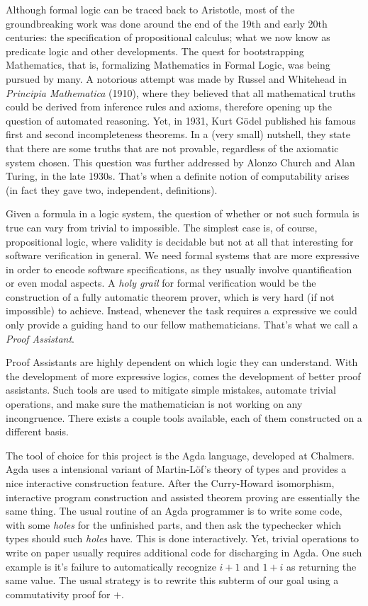 Although formal logic can be traced back to Aristotle, most of the
groundbreaking work was done around the end of the 19th and early 20th centuries:
the specification of propositional calculus; what we now know as predicate logic and other developments. The quest for bootstrapping Mathematics, that is, formalizing Mathematics in Formal Logic, was
being pursued by many. A notorious attempt was made by Russel and Whitehead in \emph{Principia Mathematica} (1910), where they believed that all mathematical truths
could be derived from inference rules and axioms, therefore opening up the question of automated reasoning. Yet, in 1931, Kurt G\"{o}del published his famous first and second incompleteness theorems. In a (very small) nutshell, they state that there are some truths that are not provable, regardless of the axiomatic system chosen. This question was further addressed by Alonzo Church and Alan Turing, in the late 1930s. That's when a definite notion of computability arises (in fact they gave two, independent, definitions). 

Given a formula in a logic system, the question of whether or not such formula is true can vary from trivial to impossible. The simplest case is, of course, propositional logic, where validity is decidable but not at all that interesting
for software verification in general. We need formal systems that are more expressive in order to encode software specifications, as they usually involve quantification or even modal aspects.  A \emph{holy grail} for formal verification would be the construction of a fully automatic theorem prover, which is very hard (if not impossible) to achieve. Instead, whenever the task requires a expressive we could only provide a guiding hand to our fellow mathematicians. That's what we call a \emph{Proof Assistant}.

Proof Assistants are highly dependent on which logic they can understand. With the development of more
expressive logics, comes the development of better proof assistants. Such tools are used to mitigate
simple mistakes, automate trivial operations, and make sure the mathematician is not working
on any incongruence. There exists a couple tools available, each of them constructed on a different
basis. 

The tool of choice for this project is the Agda language, developed at Chalmers. Agda uses a intensional
variant of Martin-L\"{o}f's theory of types and provides a nice interactive construction feature. After
the Curry-Howard isomorphism, interactive program construction and assisted theorem proving are essentially
the same thing. The usual routine of an Agda programmer is to write some code, with some \emph{holes} for
the unfinished parts, and then ask the typechecker which types should such \emph{holes} have. This is done
interactively. Yet, trivial operations to write on paper usually requires additional code
for discharging in Agda. One such example is it's failure to automatically recognize $i + 1$ and
$1 + i$ as returning the same value. The usual strategy is to rewrite this subterm of our goal
using a commutativity proof for $+$. 

